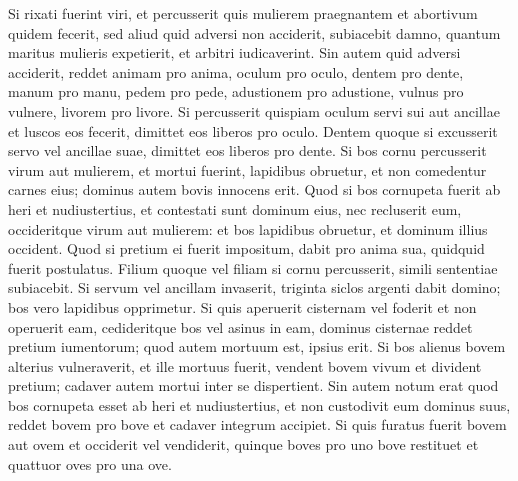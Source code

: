 \begin{biblechapter}
\begin{biblechapter}
\begin{biblechapter}
\begin{biblechapter}
\begin{biblechapter}
\begin{biblechapter}
\begin{biblechapter}
\begin{biblechapter}
\begin{biblechapter}
\begin{biblechapter}
\begin{biblechapter}
\begin{biblechapter}
\begin{biblechapter}
\begin{biblechapter}
\begin{biblechapter}
\begin{biblechapter}
\begin{biblechapter}
\begin{biblechapter}
\begin{biblechapter}
\begin{biblechapter}
\begin{biblechapter}
 \verse Si rixati fuerint viri, et percusserit quis mulierem praegnantem et abortivum quidem fecerit, sed aliud quid adversi non acciderit, subiacebit damno, quantum maritus mulieris expetierit, et arbitri iudicaverint. 
\verse Sin autem quid adversi acciderit, reddet animam pro anima, 
\verse oculum pro oculo, dentem pro dente, manum pro manu, pedem pro pede, 
\verse adustionem pro adustione, vulnus pro vulnere, livorem pro livore. 
\verse Si percusserit quispiam oculum servi sui aut ancillae et luscos eos fecerit, dimittet eos liberos pro oculo. 
\verse Dentem quoque si excusserit servo vel ancillae suae, dimittet eos liberos pro dente.
 \verse Si bos cornu percusserit virum aut mulierem, et mortui fuerint, lapidibus obruetur, et non comedentur carnes eius; dominus autem bovis innocens erit. 
 \verse Quod si bos cornupeta fuerit ab heri et nudiustertius, et contestati sunt dominum eius, nec recluserit eum, occideritque virum aut mulierem: et bos lapidibus obruetur, et dominum illius occident. 
\verse Quod si pretium ei fuerit impositum, dabit pro anima sua, quidquid fuerit postulatus. 
\verse Filium quoque vel filiam si cornu percusserit, simili sententiae subiacebit. 
\verse Si servum vel ancillam invaserit, triginta siclos argenti dabit domino; bos vero lapidibus opprimetur.
 \verse Si quis aperuerit cisternam vel foderit et non operuerit eam, cedideritque bos vel asinus in eam, 
\verse dominus cisternae reddet pretium iumentorum; quod autem mortuum est, ipsius erit.
 \verse Si bos alienus bovem alterius vulneraverit, et ille mortuus fuerit, vendent bovem vivum et divident pretium; cadaver autem mortui inter se dispertient. 
 \verse Sin autem notum erat quod bos cornupeta esset ab heri et nudiustertius, et non custodivit eum dominus suus, reddet bovem pro bove et cadaver integrum accipiet. 
\verse Si quis furatus fuerit bovem aut ovem et occiderit vel vendiderit, quinque boves pro uno bove restituet et quattuor oves pro una ove.
 

\end{biblechapter}
\end{biblechapter}
\end{biblechapter}
\end{biblechapter}
\end{biblechapter}
\end{biblechapter}
\end{biblechapter}
\end{biblechapter}
\end{biblechapter}
\end{biblechapter}
\end{biblechapter}
\end{biblechapter}
\end{biblechapter}
\end{biblechapter}
\end{biblechapter}
\end{biblechapter}
\end{biblechapter}
\end{biblechapter}
\end{biblechapter}
\end{biblechapter}
\end{biblechapter}
